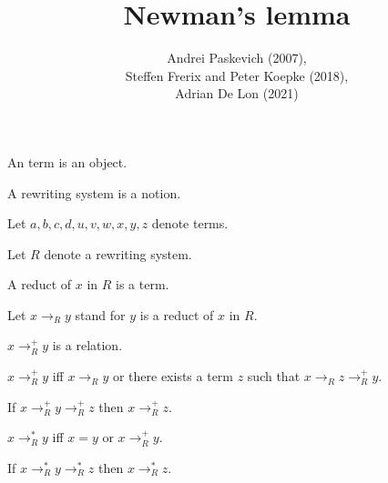 \documentclass{article}
\title{Newman's lemma}
\author{Andrei Paskevich (2007), \\
Steffen Frerix and Peter Koepke (2018), \\
Adrian De Lon (2021)}
\date{}
\newcommand{\reduces}[1]{\to_{#1}}
\newcommand{\reducesTC}[1]{\to_{#1}^{+}}
\newcommand{\reducesTCR}[1]{\to_{#1}^{*}}
\begin{document}

  \maketitle
  
  \begin{forthel}
  \end{forthel}

  \begin{forthel}

    \begin{signature}
      An term is an object.
    \end{signature}

    \begin{signature}
      A rewriting system is a notion.
    \end{signature}

    Let $a,b,c,d,u,v,w,x,y,z$ denote terms.

    Let $R$ denote a rewriting system.

    \begin{signature}[Reduct]
      A reduct of $x$ in $R$ is a term.
    \end{signature}

    Let $x \reduces{R} y$ stand for $y$ is a reduct of $x$ in $R$.

    \begin{signature}
      $x \reducesTC{R} y$ is a relation.
    \end{signature}

    \begin{axiom}
      $x \reducesTC{R} y$ iff $x \reduces{R} y$
      or there exists a term $z$ such that
      $x \reduces{R} z \reducesTC{R} y$.
    \end{axiom}

    \begin{axiom}
      If $x \reducesTC{R} y \reducesTC{R} z$ then $x \reducesTC{R} z$.
    \end{axiom}

    \begin{definition}
      $x \reducesTCR{R} y$ iff $x = y$ or $x \reducesTC{R} y$.
    \end{definition}

    \begin{lemma}
      If $x \reducesTCR{R} y \reducesTCR{R} z$ then $x \reducesTCR{R} z$.
    \end{lemma}


\end{forthel}
\end{document}
